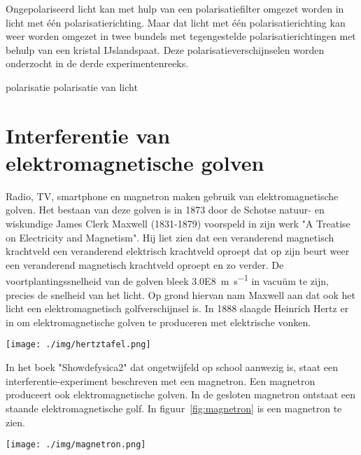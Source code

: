 {Ongepolariseerd licht kan met hulp van een polarisatiefilter omgezet worden in licht met \'e\'en polarisatierichting. Maar dat licht met \'e\'en polarisatierichting kan weer worden omgezet in twee bundels met tegengestelde polarisatierichtingen met behulp van een kristal IJslandspaat. Deze polarisatieverschijnselen worden onderzocht in de derde experimentenreeks.
\begin{experiment}{polarisatie}
polarisatie van licht
\end{experiment}

\section{Interferentie van elektromagnetische golven}
Radio, TV, smartphone en magnetron maken gebruik van elektromagnetische golven.
Het bestaan van deze golven is in 1873 door de Schotse natuur- en wiskundige James Clerk Maxwell (1831-1879) voorspeld in zijn werk "A Treatise on Electricity and Magnetism". Hij liet zien dat een veranderend magnetisch krachtveld een veranderend elektrisch krachtveld oproept dat op zijn beurt weer een veranderend magnetisch krachtveld oproept en zo verder. De voortplantingssnelheid van de golven bleek \SI{3.0E8}{\meter\per\second} in vacu\"um te zijn, precies de snelheid van het licht. Op grond hiervan nam Maxwell aan dat ook het licht een elektromagnetisch golfverschijnsel is. In 1888 slaagde Heinrich Hertz er in om elektromagnetische golven te produceren met elektrische vonken. 

\begin{center}
\leavevmode
\texttt{[image: ./img/hertztafel.png]}
\end{center}

In het boek "Showdefysica2" dat ongetwijfeld op school aanwezig is, staat een interferentie-experiment beschreven met een magnetron. Een magnetron produceert ook elektromagnetische golven. In de gesloten magnetron ontstaat een staande elektromagnetische golf. In figuur~\ref{fig:magnetron} is een magnetron te zien.

\begin{center}
\leavevmode
\texttt{[image: ./img/magnetron.png]}
\end{center}

}
